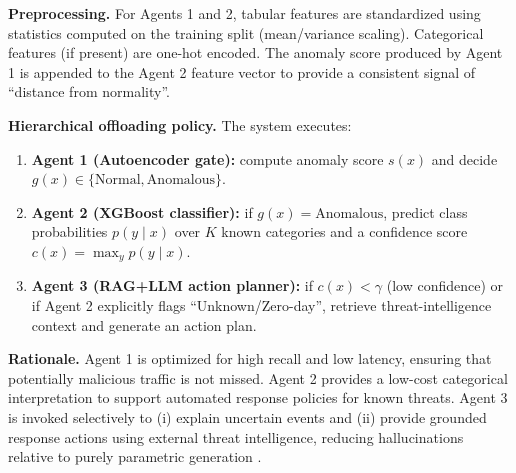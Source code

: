 \documentclass[conference]{IEEEtran}
\begin{document}
\textbf{Preprocessing.} For Agents 1 and 2, tabular features are standardized using statistics computed on the training split (mean/variance scaling). Categorical features (if present) are one-hot encoded. The anomaly score produced by Agent 1 is appended to the Agent 2 feature vector to provide a consistent signal of ``distance from normality''.

\textbf{Hierarchical offloading policy.} The system executes:
\begin{enumerate}
  \item \textbf{Agent 1 (Autoencoder gate):} compute anomaly score $s(x)$ and decide $g(x)\in\{\text{Normal},\text{Anomalous}\}$.
  \item \textbf{Agent 2 (XGBoost classifier):} if $g(x)=\text{Anomalous}$, predict class probabilities $p(y\mid x)$ over $K$ known categories and a confidence score $c(x)=\max_y p(y\mid x)$.
  \item \textbf{Agent 3 (RAG+LLM action planner):} if $c(x)<\gamma$ (low confidence) or if Agent 2 explicitly flags ``Unknown/Zero-day'', retrieve threat-intelligence context and generate an action plan.
\end{enumerate}

\textbf{Rationale.} Agent 1 is optimized for high recall and low latency, ensuring that potentially malicious traffic is not missed. Agent 2 provides a low-cost categorical interpretation to support automated response policies for known threats. Agent 3 is invoked selectively to (i) explain uncertain events and (ii) provide grounded response actions using external threat intelligence, reducing hallucinations relative to purely parametric generation \cite{Lewis2020RAG}.
\end{document}

